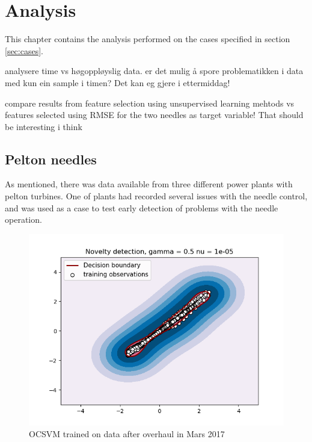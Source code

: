 \chapter{Analysis}\label{cha:analysis}
This chapter contains the analysis performed on the cases specified in section \ref{sec:cases}. 


analysere time vs høgoppløyslig data. er det mulig å spore problematikken i data med kun ein sample i timen? 
Det kan eg gjere i ettermiddag! 

compare results from feature selection using unsupervised learning mehtods vs features selected using RMSE for the two needles as target variable! That should be interesting i think 



\section{Pelton needles}\label{sub:pelton_needles}
    As mentioned, there was data available from three different power plants with pelton turbines. One of plants had recorded several issues with the needle control, and was used as a case to test early detection of problems with the needle operation. 
    
    
    \begin{figure}
        \centering
        \includegraphics[scale=0.8]{report/figures/analysis/hjartdola/hjar_n2_4_novelty_05_1e-5_train.png}
        \caption{OCSVM trained on data after overhaul in Mars 2017}
        \label{fig:my_label}
    \end{figure}


